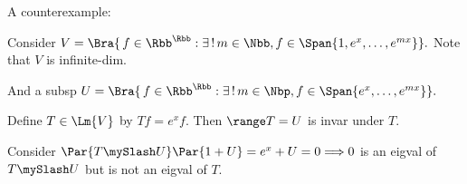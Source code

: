 A counterexample:\par\quad
Consider $V=\Bra{\,f\in\Rbb^{\Rbb}:\exists\,!\,m\in\Nbb,f\in\Span{1,e^x,\dots,e^{mx}}}.$ Note that $V$ is infinite-dim.\par\quad
And a subsp $U=\Bra{\,f\in\Rbb^{\Rbb}:\exists\,!\,m\in\Nbp,f\in\Span{e^x,\dots,e^{mx}}}.$\par\quad
Define $T\in\Lm{V}$ by $Tf=e^x f.$ Then $\range T=U$ is invar under $T.$\par\quad
Consider $\Par{T\mySlash U}\Par{1+U}=e^x+U=0\Longrightarrow 0$ is an eigval of $T\mySlash U$ but is not an eigval of $T$.\par\quad
{}\PfEnd
\SepLine

